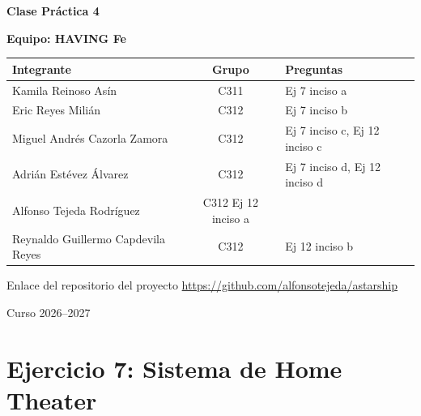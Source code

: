 \documentclass[11pt, a4paper]{article}
\begin{document}
\vspace*{1.5cm}

\begin{center}
    {\huge \textbf{Clase Práctica 4}}
    
    \vspace{1.2cm}
    
    {\large \textbf{Equipo: HAVING Fe}}
    
    \vspace{0.8cm}
    
    \begin{table}[h!]
        \centering
        \begin{tabular}{lc}
            \toprule
            \textbf{Integrante} & \textbf{Grupo} & \textbf{Preguntas}\\
            \midrule
            Kamila Reinoso Asín & C311 & Ej 7 inciso a\\
            Eric Reyes Milián & C312 & Ej 7 inciso b\\
            Miguel Andrés Cazorla Zamora & C312  & Ej 7 inciso c, Ej 12 inciso c\\
            Adrián Estévez Álvarez & C312 & Ej 7 inciso d, Ej 12 inciso d\\
            Alfonso Tejeda Rodríguez & C312  Ej 12 inciso a\\
            Reynaldo Guillermo Capdevila Reyes & C312 & Ej 12 inciso b\\
            \bottomrule
        \end{tabular}
    \end{table}
    
    \vspace{2.5cm}
    Enlace del repositorio del proyecto
    \url{https://github.com/alfonsotejeda/astarship}

    \vspace{2.5cm}
    {\normalsize Curso 2026--2027}
\end{center}

{}
\section*{Ejercicio 7: Sistema de Home Theater}

\vspace{0.5cm}

\sloppy
\end{document}
